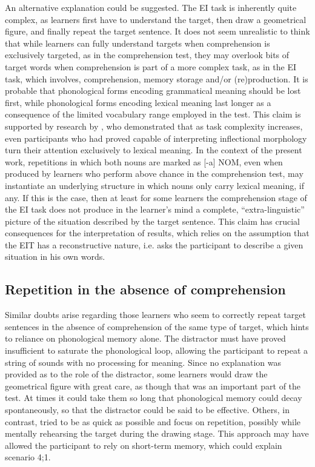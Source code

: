 An alternative explanation could be suggested. The EI task is inherently quite complex, as learners first have to understand the target, then draw a geometrical figure, and finally repeat the target sentence. It does not seem unrealistic to think that while learners can fully understand targets when comprehension is exclusively targeted, as in the comprehension test, they may overlook bits of target words when comprehension is part of a more complex task, as in the EI task, which involves, comprehension, memory storage and/or (re)production. It is probable that phonological forms encoding grammatical meaning should be lost first, while phonological forms encoding lexical meaning last longer as a consequence of the limited vocabulary range employed in the test. This claim is supported by research by \citet{EllisSagarra2011}, who demonstrated that as task complexity increases, even participants who had proved capable of interpreting inflectional morphology turn their attention exclusively to lexical meaning. In the context of the present work, repetitions in which both nouns are marked as [-a] NOM, even when produced by learners who perform above chance in the comprehension test, may instantiate an underlying structure in which nouns only carry lexical meaning, if any. If this is the case, then at least for some learners the comprehension stage of the EI task does not produce in the learner’s mind a complete, “extra-linguistic” picture of the situation described by the target sentence. This claim has crucial consequences for the interpretation of results, which relies on the assumption that the EIT has a reconstructive nature, i.e. asks the participant to describe a given situation in his own words.

\subsection{Repetition in the absence of comprehension}\label{sec:08:4.2}

Similar doubts arise regarding those learners who seem to correctly repeat target sentences in the absence of comprehension of the same type of target, which hints to reliance on phonological memory alone. The distractor must have proved insufficient to saturate the phonological loop, allowing the participant to repeat a string of sounds with no processing for meaning. Since no explanation was provided as to the role of the distractor, some learners would draw the geometrical figure with great care, as though that was an important part of the test. At times it could take them so long that phonological memory could decay spontaneously, so that the distractor could be said to be effective. Others, in contrast, tried to be as quick as possible and focus on repetition, possibly while mentally rehearsing the target during the drawing stage. This approach may have allowed the participant to rely on short-term memory, which could explain scenario 4;1. 

